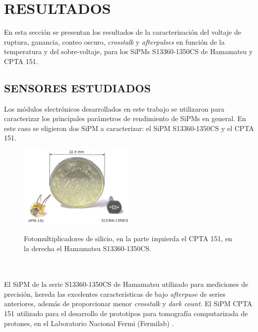 \chapter{RESULTADOS}
En esta sección se presentan los resultados de la caracterización del voltaje de ruptura, ganancia, conteo oscuro, \textit{crosstalk} y \textit{afterpulses} en función de la temperatura y del sobre-voltaje, para los SiPMs S13360-1350CS de Hamamatsu y CPTA 151.   
\label{Cap:Caracterizacion}
\section{SENSORES ESTUDIADOS}
Los módulos electrónicos desarrollados en este trabajo se utilizaron para caracterizar los principales parámetros de rendimiento de SiPMs en general. En este caso se eligieron dos SiPM a caracterizar: el SiPM S13360-1350CS y el CPTA 151.
\begin{figure}[h!]
\begin{centering}
    \caption{Fotomultiplicadores de silicio, en la parte izquierda el CPTA 151, en la derecha el Hamamatsu S13360-1350CS.}%
   \includegraphics[width=0.5\textwidth]{Images/SiPMs.PNG}
    \label{fig:SiPMs}  
  \par\end{centering}
\end{figure}
\\ \\
El SiPM de la serie S13360-1350CS de Hamamatsu %
utilizado para mediciones de precisión, hereda las excelentes características de bajo \textit{afterpuse} de series anteriores, además de proporcionar menor \textit{crosstalk} y \textit{dark count}.
El SiPM CPTA 151 utilizado para el desarrollo de prototipos para tomografía computarizada de protones, en el Laboratorio Nacional Fermi (Fermilab) \citep{pCT_fermilab}.\\ \\%
